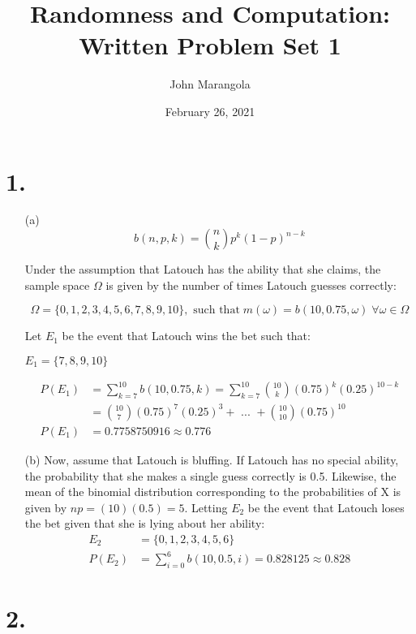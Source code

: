 \documentclass[12pt]{article}
\title{Randomness and Computation: Written Problem Set 1}
\author{John Marangola}
\date{February 26, 2021}
\begin{document}
\maketitle

\newcommand{\ec}{\frac{1}{4\pi\epsilon_0}}
\newcommand{\qa}{\frac{q^2}{a^2}}
\newcommand{\ih}{\hat{i}}
\newcommand{\jh}{\hat{j}}
\newcommand{\kh}{\hat{k}}
\newcommand{\at}[2][]{#1|_{#2}}
\section*{1.}
    \begin{enumerate}
        \item[(a)]
        \begin{equation}
            b(n, p, k) = \binom{n}{k}p^{k}\left(1-p\right)^{n-k}
        \end{equation}
        \begin{flushleft}
        
            Under the assumption that Latouch has the ability that she claims, the sample space $\Omega$ is given by the number of times Latouch guesses correctly:
        \end{flushleft}
        \begin{equation*}
            \Omega = \{0, 1, 2, 3, 4, 5, 6, 7, 8, 9, 10\}, \text{ such that} \; m(\omega)=b(10, 0.75, \omega) \; \forall \omega\in\Omega 
        \end{equation*}
        \begin{flushleft}
            Let $E_1$ be the event that Latouch wins the bet such that:
        \end{flushleft}
        \begin{center}
            $E_1 = \{7, 8, 9, 10\}$
        \end{center}
        \begin{align*}
            P(E_1) &= \sum_{k=7}^{10}{b(10, 0.75, k)} = \sum_{k=7}^{10}{\binom{10}{k}(0.75)^{k}\left(0.25\right)^{10-k}} \\
            &= \binom{10}{7}(0.75)^7 (0.25)^3 +\text{ ... } + \binom{10}{10}(0.75)^{10} \\
            P(E_1) &= 0.7758750916 \approx 0.776
        \end{align*}
        \item[(b)] Now, assume that Latouch is bluffing. If Latouch has no special ability, the probability that she makes a single guess correctly is 0.5. Likewise, the mean of the binomial distribution corresponding to the probabilities of X is given by $np=(10)(0.5)=5$. Letting $E_2$ be the event that Latouch loses the bet given that she is lying about her ability:
        \begin{align*}
            E_2 &= \{0, 1, 2, 3, 4, 5, 6\} \\
            P(E_2) &= \sum_{i=0}^6 b(10, 0.5, i) =0.828125\approx 0.828
        \end{align*}
    \end{enumerate}
\section*{2.}
\end{document}
